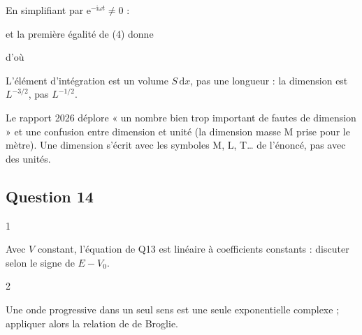 \documentclass[11pt,a4paper]{article}
\newcommand{\equationajustee}[1]{%
  \sbox{\boiteequation}{$\displaystyle #1$}%
  \ifdim\wd\boiteequation>\linewidth
    \[\resizebox{\linewidth}{!}{\usebox{\boiteequation}}\]%
  \else
    \[#1\]%
  \fi}
\begin{document}
En simplifiant par \(\mathrm e^{-\mathrm i\omega t}\ne0\) :

\equationajustee{\boxed{-\frac{\hbar^2}{2m}\frac{\mathrm d^2\underline\psi}{\mathrm dx^2}+V(x)\underline\psi=E\underline\psi}}

et la première égalité de (4) donne

\equationajustee{\begin{aligned}
\mathrm i\hbar\partial_t\underline\Psi&=\hbar\omega\underline\Psi\\
&=E\underline\Psi,
\end{aligned}}

d'où

\equationajustee{\boxed{E=\hbar\omega}}

\begin{piege}

L'élément d'intégration est un volume \(S\,\mathrm dx\), pas une longueur : la dimension est \(L^{-3/2}\), pas \(L^{-1/2}\).

\end{piege}

\begin{jury}

Le rapport 2026 déplore « un nombre bien trop important de fautes de dimension » et une confusion entre dimension et unité (la dimension masse M prise pour le mètre). Une dimension s'écrit avec les symboles M, L, T\ldots{} de l'énoncé, pas avec des unités.

\end{jury}

\hypertarget{question-14}{%
\subsection{Question 14}\label{question-14}}

\begin{indication}{1}

Avec \(V\) constant, l'équation de Q13 est linéaire à coefficients constants : discuter selon le signe de \(E-V_0\).

\end{indication}

\begin{indication}{2}

Une onde progressive dans un seul sens est une seule exponentielle complexe ; appliquer alors la relation de de Broglie.

\end{indication}
\end{document}

